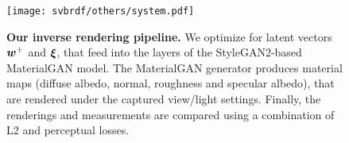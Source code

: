 \begin{figure}[!ht]
	\centering
	\texttt{[image: svbrdf/others/system.pdf]}
	\caption[Inverse rendering pipeline]{\label{fig:svbrdf:framework}
		\textbf{Our inverse rendering pipeline.} We optimize for latent vectors $\bm{w}^+$ and $\bm\xi$, that feed into the layers of the StyleGAN2-based MaterialGAN model. 
		The MaterialGAN generator produces material maps (diffuse albedo, normal, roughness and specular albedo), that are rendered under the captured view/light settings. 
		Finally, the renderings and measurements are compared using a combination of L2 and perceptual losses.
	}
\end{figure}
